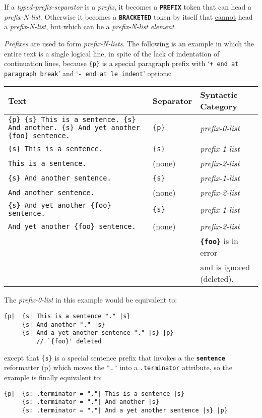 \documentclass[12pt]{article}
\newcommand{\TT}[1]{{\tt \bfseries #1}}
\newcommand{\pagref}[1]{p\pageref{#1}}
\newenvironment{indpar}[1][0.3in]%
	{\begin{list}{}%
		     {\setlength{\itemsep}{0in}%
		      \setlength{\topsep}{0in}%
		      \setlength{\parsep}{1ex}%
		      \setlength{\labelwidth}{#1}%
		      \setlength{\leftmargin}{#1}%
		      \addtolength{\leftmargin}{\labelsep}}%
	 \item}%
	{\end{list}}
\begin{document}
If a {\em typed-prefix-separator} is a {\em prefix},
it becomes a \TT{PREFIX} token that can head a {\em prefix-N-list}.
Otherwise it becomes a \TT{BRACKETED} token by itself
that \underline{cannot} head a {\em prefix-N-list}, but which can
be a {\em prefix-N-list} {\em element}.

{\em Prefixes} are used to form {\em prefix-N-lists}.%
\label{PREFIX-0-LIST}
The following is an example in which the entire text is a single
logical line, in spite of the lack of indentation of continuation
lines, because {\tt \{p\}} is a special
paragraph prefix with `{\tt + end at paragraph break}'
and `{\tt - end at le indent}' options:


\begin{tabular}{p{3.5in}|l|l}
Text	& Separator &  Syntactic Category
\\\hline
\raggedright
\tt \{p\} \{s\} This is a sentence. \{s\} And
another.  \{s\} And yet another
\{foo\} sentence. & \tt \{p\} & \em prefix-0-list
\\\hline
\tt \{s\} This is a sentence.	& \tt \{s\} & \em prefix-1-list
\\\hline
\tt This is a sentence.	& (none) & \em prefix-2-list
\\\hline
\tt \{s\} And another sentence.  	& \tt \{s\} & \em prefix-1-list
\\\hline
\tt And another sentence. & (none) & \em prefix-2-list
\\\hline
\tt \{s\} And yet another \{foo\} sentence. & \tt \{s\} & \em prefix-1-list
\\\hline
\tt And yet another \{foo\} sentence. & (none) & \em prefix-2-list \\
			       &        & \TT{\{foo\}} is in error \\
			       &        & and is ignored (deleted).
\end{tabular}

The {\em prefix-0-list} in this example would be equivalent to:
\begin{indpar}\begin{verbatim}
{p|  {s| This is a sentence "." |s}
     {s| And another "." |s}
     {s| And a yet another sentence "." |s} |p}
         // `{foo}' deleted
\end{verbatim}\end{indpar}

except that {\tt \{s\}} is a special sentence prefix that invokes
a the \TT{sentence} reformatter (\pagref{SENTENCE-REFORMATTER})
which moves the {\tt "."} into a {\tt .terminator} attribute, so the
example is finally equivalent to:
\begin{indpar}[0.2in]\begin{verbatim}
{p|  {s: .terminator = "."| This is a sentence |s}
     {s: .terminator = "."| And another |s}
     {s: .terminator = "."| And a yet another sentence |s} |p}
\end{verbatim}\end{indpar}
\end{document}
